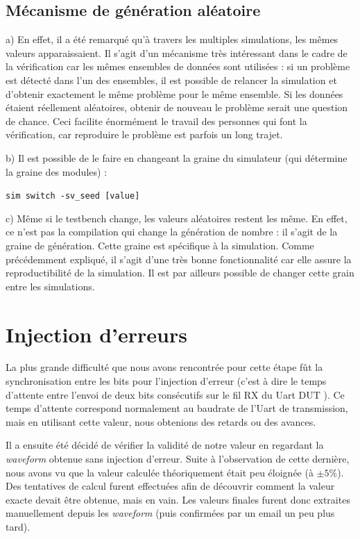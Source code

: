\documentclass[12pt, titlepage]{article}
\newcommand{\theDut}{Uart DUT }
\begin{document}
    \subsection{Mécanisme de génération aléatoire}
    a) En effet, il a été remarqué qu'à travers les multiples simulations, les mêmes valeurs apparaissaient. Il s'agit d'un mécanisme très intéressant dans le cadre de la vérification car les mêmes ensembles de données sont utilisées : si un problème est détecté dans l'un des ensembles, il est possible de relancer la simulation et d'obtenir exactement le même problème pour le même ensemble. Si les données étaient réellement aléatoires, obtenir de nouveau le problème serait une question de chance. Ceci facilite énormément le travail des personnes qui font la vérification, car reproduire le problème est parfois un long trajet.

    b) Il est possible de le faire en changeant la graine du simulateur (qui détermine la graine des modules) :

    \texttt{sim switch -sv\_seed [value]}
    
    c) Même si le testbench change, les valeurs aléatoires restent les même. En effet, ce n'est pas la compilation qui change la génération de nombre : il s'agit de la graine de génération. Cette graine est spécifique à la simulation. Comme précédemment expliqué, il s'agit d'une très bonne fonctionnalité car elle assure la reproductibilité de la simulation. Il est par ailleurs possible de changer cette grain entre les simulations.
    


\section{Injection d'erreurs} 
	
	La plus grande difficulté que nous avons rencontrée pour cette étape fût la synchronisation entre les bits pour l'injection d'erreur (c'est à dire le temps d'attente entre l'envoi de deux bits consécutifs sur le fil RX du \theDut). Ce temps d'attente correspond normalement au baudrate de l'Uart de transmission, mais en utilisant cette valeur, nous obtenions des retards ou des avances.
	
	Il a ensuite été décidé de vérifier la validité de notre valeur en regardant la \emph{waveform} obtenue sans injection d'erreur. Suite à l'observation de cette dernière, nous avons vu que la valeur calculée théoriquement était peu éloignée (à $ \pm5 \%$). Des tentatives de calcul furent effectuées afin de découvrir comment la valeur exacte devait être obtenue, mais en vain. Les valeurs finales furent donc extraites manuellement depuis les \emph{waveform} (puis confirmées par un email un peu plus tard).
    
\end{document}
